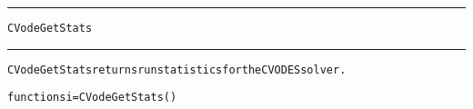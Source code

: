 \begin{samepage}
\hrule
\begin{center}
{\large \verb!CVodeGetStats!}
\label{p:CVodeGetStats}
\end{center}
\hrule\vspace{0.1in}



\begin{alltt}
CVodeGetStats returns run statistics for the CVODES solver.
\end{alltt}

\end{samepage}



\begin{samepage}


\begin{alltt}
function si = CVodeGetStats() 
\end{alltt}

\end{samepage}



